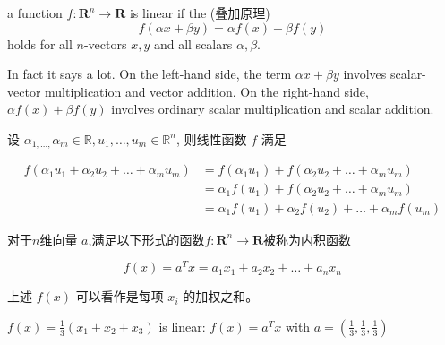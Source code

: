 \begin{theorem}
        a function $ f: \mathbf{R}^{n} \rightarrow \mathbf{R} $ is linear if the  (叠加原理)
    \begin{equation}
    f(\alpha x+\beta y)=\alpha f(x)+\beta f(y)
    \end{equation}
    holds for all $ n $-vectors $ x, y $ and all scalars $ \alpha, \beta $.
    
\end{theorem}

In fact it says a lot. On the left-hand side, the term $ \alpha x+\beta y $ involves scalar-vector multiplication and vector addition. On the right-hand side, $ \alpha f(x)+\beta f(y) $ involves ordinary scalar multiplication and scalar addition.

\begin{corollary}
    设 $ \alpha_{1, \ldots,} \alpha_{m} \in \mathbb{R}, u_{1}, \ldots, u_{m} \in \mathbb{R}^{n} $, 则线性函数 $ f $ 满足

    \begin{equation} \begin{aligned} f\left(\alpha_{1} u_{1}+\alpha_{2} u_{2}+\ldots+\alpha_{m} u_{m}\right) &=f\left(\alpha_{1} u_{1}\right)+f\left(\alpha_{2} u_{2}+\ldots+\alpha_{m} u_{m}\right) \\ &=\alpha_{1} f\left(u_{1}\right)+f\left(\alpha_{2} u_{2}+\ldots+\alpha_{m} u_{m}\right) \\ &=\alpha_{1} f\left(u_{1}\right)+\alpha_{2} f\left(u_{2}\right)+\ldots+\alpha_{m} f\left(u_{m}\right) \end{aligned} \end{equation}
\end{corollary}

\begin{definition}
    对于$n$维向量 $ a $,满足以下形式的函数$ f: \mathbf{R}^{n} \rightarrow \mathbf{R} $被称为内积函数

    \begin{equation} f(x)=a^{T} x=a_{1} x_{1}+a_{2} x_{2}+\ldots+a_{n} x_{n} \end{equation}
\end{definition}

上述 $ f(x) $ 可以看作是每项 $ x_{{i}} $ 的加权之和。 

\begin{example}
    $ f(x)=\frac{1}{3}\left(x_{1}+x_{2}+x_{3}\right) $ is linear: $ f(x)=a^{T} x $ with $ a=\left(\frac{1}{3}, \frac{1}{3}, \frac{1}{3}\right) $
\end{example}

